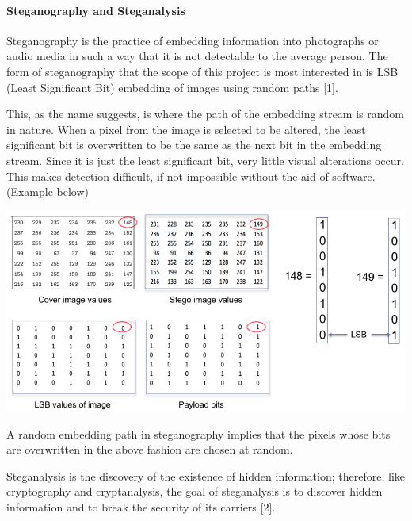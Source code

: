 \documentclass[12pt]{article}
\begin{document}
\paragraph{Steganography and Steganalysis}
\par Steganography is the practice of embedding information into photographs or audio media in such a way that it is not detectable to the average person. The form of steganography that the scope of this project is most interested in is LSB (Least Significant Bit) embedding of images using random paths [1].
\par This, as the name suggests, is where the path of the embedding stream is random in nature. When a pixel from the image is selected to be altered, the least significant bit is overwritten to be the same as the next bit in the embedding stream. Since it is just the least significant bit, very little visual alterations occur. This makes detection difficult, if not impossible without the aid of software. (Example below) \\
\begin{center}
\includegraphics[scale=.5]{LBS.png}
\end{center} 
\par A random embedding path in steganography implies that the pixels whose bits are overwritten in the above fashion are chosen at random.
\par Steganalysis is the discovery of the existence of hidden information; therefore, like cryptography and cryptanalysis, the goal of steganalysis is to discover hidden information and to break the security of its carriers [2].
\end{document}
